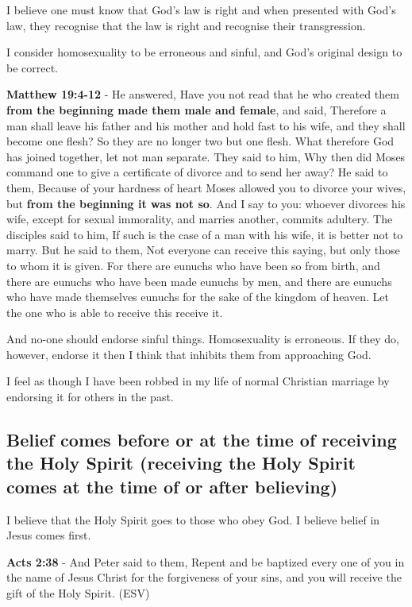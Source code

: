 \documentclass[11pt]{article}
\begin{document}
I believe one must know that God's law is
right and when presented with God's law, they
recognise that the law is right and recognise
their transgression.

I consider homosexuality to be erroneous and sinful, and God's original design to be correct.

\textbf{Matthew 19:4-12} - He answered, Have you not read that he who created them \textbf{from the beginning made them male and female}, and said, Therefore a man shall leave his father and his mother and hold fast to his wife, and they shall become one flesh?  So they are no longer two but one flesh. What therefore God has joined together, let not man separate.  They said to him, Why then did Moses command one to give a certificate of divorce and to send her away?  He said to them, Because of your hardness of heart Moses allowed you to divorce your wives, but \textbf{from the beginning it was not so}.  And I say to you: whoever divorces his wife, except for sexual immorality, and marries another, commits adultery.  The disciples said to him, If such is the case of a man with his wife, it is better not to marry.  But he said to them, Not everyone can receive this saying, but only those to whom it is given.  For there are eunuchs who have been so from birth, and there are eunuchs who have been made eunuchs by men, and there are eunuchs who have made themselves eunuchs for the sake of the kingdom of heaven. Let the one who is able to receive this receive it.

And no-one should endorse sinful things. Homosexuality is erroneous.
If they do, however, endorse it then I think that inhibits them from approaching God.

I feel as though I have been robbed in my life of normal Christian marriage by endorsing it for others in the past.

\subsection{Belief comes before or at the time of receiving the Holy Spirit (receiving the Holy Spirit comes at the time of or after believing)}
\label{sec:org4eca045}
I believe that the Holy Spirit goes to those who obey God. I believe belief in Jesus comes first.

\textbf{Acts 2:38} - And Peter said to them, Repent and be baptized every one of you in the name of Jesus Christ for the forgiveness of your sins, and you will receive the gift of the Holy Spirit. (ESV)
\end{document}
